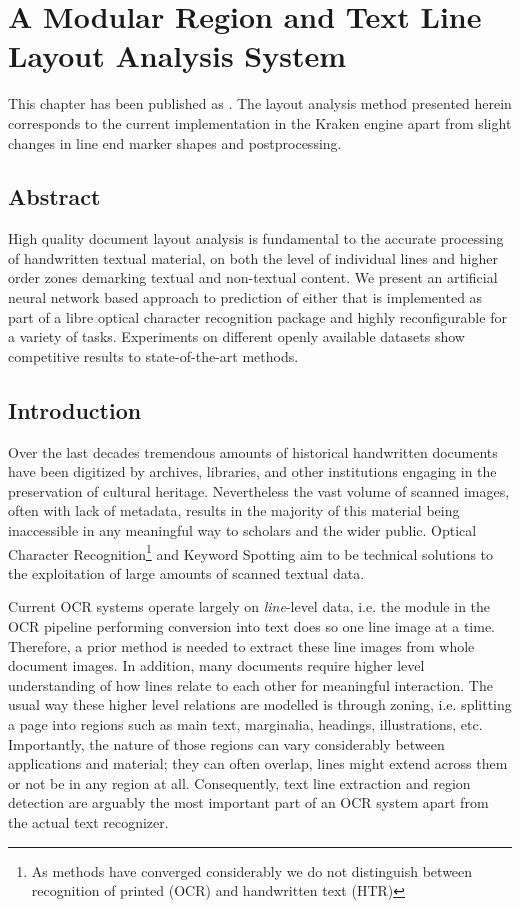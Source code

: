\chapter{A Modular Region and Text Line Layout Analysis System}
\thispagestyle{empty}
\vfill
This chapter has been published as . The layout
analysis method presented herein corresponds to the current implementation in
the Kraken engine apart from slight changes in line end marker shapes and
postprocessing.
\label{ch:icfhr}
\newpage

\section*{Abstract}
High quality document layout analysis is fundamental to the accurate processing
of handwritten textual material, on both the level of individual lines and
higher order zones demarking textual and non-textual content. We present an
artificial neural network based approach to prediction of either that is
implemented as part of a libre optical character recognition package and highly
reconfigurable for a variety of tasks. Experiments on different openly
available datasets show competitive results to state-of-the-art methods.

\section{Introduction}

Over the last decades tremendous amounts of historical handwritten documents
have been digitized by archives, libraries, and other institutions engaging in
the preservation of cultural heritage. Nevertheless the vast volume of scanned
images, often with lack of metadata, results in the majority of this material
being inaccessible in any meaningful way to scholars and the wider public.
Optical Character Recognition\footnote{As methods have converged considerably
we do not distinguish between recognition of printed (OCR) and handwritten text
(HTR)} and Keyword Spotting aim to be technical solutions to the exploitation
of large amounts of scanned textual data. 

Current OCR systems operate largely on \emph{line}-level data, i.e. the module
in the OCR pipeline performing conversion into text does so one line image at a
time. Therefore, a prior method is needed to extract these line images from
whole document images. In addition, many documents require higher level
understanding of how lines relate to each other for meaningful interaction. The
usual way these higher level relations are modelled is through zoning, i.e.
splitting a page into regions such as main text, marginalia, headings,
illustrations, etc. Importantly, the nature of those regions can vary
considerably between applications and material; they can often overlap, lines
might extend across them or not be in any region at all. Consequently, text
line extraction and region detection are arguably the most important part of an
OCR system apart from the actual text recognizer.

